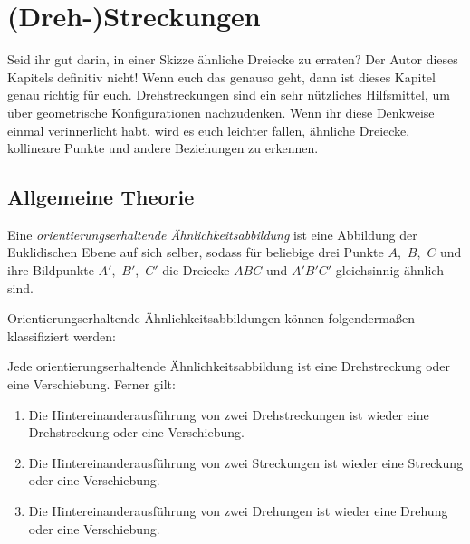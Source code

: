 \section{(Dreh-)Streckungen}\label{kapitel:Drehstreckungen}
Seid ihr gut darin, in einer Skizze ähnliche Dreiecke zu erraten? Der Autor dieses Kapitels definitiv nicht! Wenn euch das genauso geht, dann ist dieses Kapitel genau richtig für euch. Drehstreckungen sind ein sehr nützliches Hilfsmittel, um über geometrische Konfigurationen nachzudenken. Wenn ihr diese Denkweise einmal verinnerlicht habt, wird es euch leichter fallen, ähnliche Dreiecke, kollineare Punkte und andere Beziehungen zu erkennen.

\subsection*{Allgemeine Theorie}
\begin{definition}
	Eine \emph{orientierungserhaltende Ähnlichkeitsabbildung} ist eine Abbildung der Euklidischen Ebene auf sich selber, sodass für beliebige drei Punkte $A$,~$B$,~$C$ und ihre Bildpunkte $A'$,~$B'$,~$C'$ die Dreiecke $ABC$ und $A'B'C'$ gleichsinnig ähnlich sind.
\end{definition}

Orientierungserhaltende Ähnlichkeitsabbildungen können folgendermaßen klassifiziert werden:

\begin{satzmitnamen}
	Jede orientierungserhaltende Ähnlichkeitsabbildung ist eine Drehstreckung oder eine Verschiebung. Ferner gilt:
	\begin{enumerate}
		\item \label{itm:Drehstreckung}
		Die Hintereinanderausführung von zwei Drehstreckungen  ist wieder eine Drehstreckung oder eine Verschiebung.
		\item \label{itm:Streckung}
		Die Hintereinanderausführung von zwei Streckungen  ist wieder eine Streckung oder eine Verschiebung.
		\item \label{itm:Drehung}
		Die Hintereinanderausführung von zwei Drehungen  ist wieder eine Drehung oder eine Verschiebung.
	\end{enumerate}
\end{satzmitnamen}


